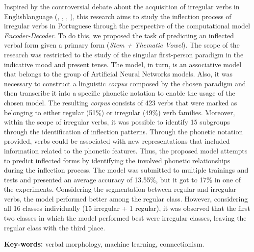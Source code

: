 \documentclass[12pt,twoside,a4paper]{book}
\begin{document}
Inspired by the controversial debate about the acquisition of irregular verbs in Englishlanguage (\cite{chomsky:1968}, \cite{Pinker:1988},
\cite{Albright2003RulesVA}, \cite{kirov:2018}), this research aims to study the inflection process of irregular verbs in Portuguese through the perspective of the computational model \textit{Encoder-Decoder}. To do this, we proposed the task of predicting an inflected verbal form given a primary form (\textit{Stem + Thematic Vowel}). The scope of the research was restricted to the study of the singular first-person paradigm in the indicative mood and present tense. The model, in turn, is an associative model that belongs to the group of Artificial Neural Networks models. Also, it was necessary to construct a linguistic \textit{corpus} composed by the chosen paradigm and then transcribe it into a specific phonetic notation to enable the usage of the chosen model. The resulting \textit{corpus} consists of 423 verbs that were marked as belonging to either regular (51\%) or irregular (49\%) verb families. Moreover, within the scope of irregular verbs, it was possible to identify 15 subgroups through the identification of inflection patterns. Through the phonetic notation provided, verbs could be associated with new representations that included information related to the phonetic features. Thus, the proposed model attempts to predict inflected forms by identifying the involved phonetic relationships during the inflection process. The model was submitted to multiple trainings and tests and presented an average accuracy of 13.55\%, but it got to 17\% in one of the experiments. Considering the segmentation between regular and irregular verbs, the model performed better among the regular class. However, considering all 16 classes individually (15 irregular + 1 regular), it was observed that the first two classes in which the model performed best were irregular classes, leaving the regular class with the third place.

\textbf{Key-words:}
verbal morphology, machine learning, connectionism.

\tableofcontents
\pagestyle{fancy}
\onehalfspacing            %
\mainmatter
{}

\fancyhead[RE,LO]{\thesection}






 \singlespacing   %
\clearpage
\end{document}

